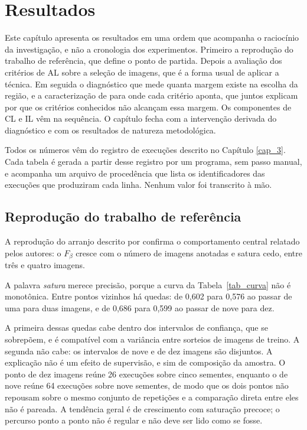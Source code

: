 \chapter{Resultados}\label{cap_4}

Este capítulo apresenta os resultados em uma ordem que acompanha o raciocínio da investigação, e não a cronologia dos experimentos. Primeiro a reprodução do trabalho de referência, que define o ponto de partida. Depois a avaliação dos critérios de \ac{AL} sobre a seleção de imagens, que é a forma usual de aplicar a técnica. Em seguida o diagnóstico que mede quanta margem existe na escolha da região, e a caracterização de para onde cada critério aponta, que juntos explicam por que os critérios conhecidos não alcançam essa margem. Os componentes de \ac{CL} e \ac{IL} vêm na sequência. O capítulo fecha com a intervenção derivada do diagnóstico e com os resultados de natureza metodológica.

Todos os números vêm do registro de execuções descrito no Capítulo \ref{cap_3}. Cada tabela é gerada a partir desse registro por um programa, sem passo manual, e acompanha um arquivo de procedência que lista os identificadores das execuções que produziram cada linha. Nenhum valor foi transcrito à mão.

\section{Reprodução do trabalho de referência}

A reprodução do arranjo descrito por \cite{soares2026flim} confirma o comportamento central relatado pelos autores: o $F_\beta$ cresce com o número de imagens anotadas e satura cedo, entre três e quatro imagens.

A palavra \emph{satura} merece precisão, porque a curva da Tabela~\ref{tab_curva} não é monotônica. Entre pontos vizinhos há quedas: de 0,602 para 0,576 ao passar de uma para duas imagens, e de 0,686 para 0,599 ao passar de nove para dez.

A primeira dessas quedas cabe dentro dos intervalos de confiança, que se sobrepõem, e é compatível com a variância entre sorteios de imagens de treino. A segunda não cabe: os intervalos de nove e de dez imagens são disjuntos. A explicação não é um efeito de supervisão, e sim de composição da amostra. O ponto de dez imagens reúne 26 execuções sobre cinco sementes, enquanto o de nove reúne 64 execuções sobre nove sementes, de modo que os dois pontos não repousam sobre o mesmo conjunto de repetições e a comparação direta entre eles não é pareada. A tendência geral é de crescimento com saturação precoce; o percurso ponto a ponto não é regular e não deve ser lido como se fosse.

